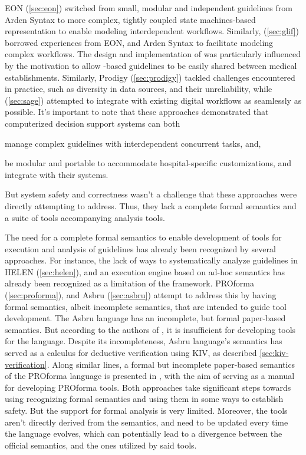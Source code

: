 EON (\autoref{sec:eon}) switched from small, modular and
independent guidelines from Arden Syntax to more complex,
tightly coupled state machines-based representation to enable modeling
interdependent workflows. Similarly, \GLIF{} (\autoref{sec:glif}) borrowed experiences from
EON, \GEODECM{} and Arden Syntax to facilitate modeling complex workflows.
The design and implementation of \GLIF{} was particularly influenced
by the motivation to allow \GLIF{}-based guidelines to be easily shared
between medical establishments. Similarly, Prodigy (\autoref{sec:prodigy})
tackled \CDSSs{} challenges encountered in practice, such as diversity in
 data sources, and their unreliability, while \SAGE{} (\autoref{sec:sage})
attempted to integrate with existing digital workflows as seamlessly as
possible. It's important to note that these approaches demonstrated that computerized decision support
systems can both
\begin{enumerate*}[label=(\alph*)]
  \item manage complex guidelines with interdependent concurrent tasks, and,
  \item be modular and portable to accommodate hospital-specific customizations,
    and integrate with their \EHR{} systems.
\end{enumerate*}
But system safety and correctness wasn't a challenge that these approaches
were directly attempting to address.
Thus, they lack a complete formal semantics and a suite of tools accompanying
analysis tools.

The need for a complete formal semantics to enable development of tools for
execution and analysis of guidelines has already been recognized by several
approaches. For instance, the lack of ways to systematically analyze guidelines
in HELEN (\autoref{sec:helen}), and an execution engine based on ad-hoc
semantics has already been recognized as a limitation of the framework.
 PROforma (\autoref{sec:proforma}), and
Asbru (\autoref{sec:asbru}) attempt to address this by having formal
semantics, albeit incomplete semantics, that are intended to guide tool
development. The Asbru language has an incomplete, but formal
\SOS{} paper-based semantics. But according to the authors of
\cite{SuttonAMIA03}, it is insufficient for developing tools for the language.
Despite its incompleteness, Asbru language's semantics has served as a calculus for deductive verification
using KIV, as described \autoref{sec:kiv-verification}.
Along similar lines, a formal but incomplete paper-based semantics
of the PROforma language is
presented in \cite{SuttonAMIA03}, with the aim of serving as a manual for
developing PROforma tools. Both approaches take significant steps towards using
recognizing formal semantics and using them in some ways
to establish \CDSS{} safety. But the support for formal analysis is very
limited. Moreover, the tools aren't directly derived
from the semantics, and need to be updated every time the language evolves,
which can potentially lead to a divergence between the official semantics, and
the ones utilized by said tools.

